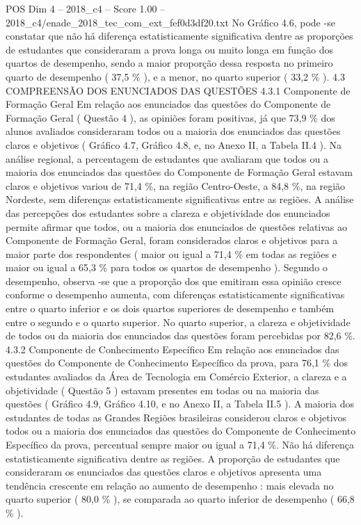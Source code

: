 \begin{textsample}{POS Dim 4 – 2018\_c4 – Score 1.00 – 2018\_c4/enade\_2018\_tec\_com\_ext\_fef0d3df20.txt}
No Gráfico 4.6, pode -se constatar que não há diferença estatisticamente significativa dentre as proporções de estudantes que consideraram a prova longa ou muito longa em função dos quartos de desempenho, sendo a maior proporção dessa resposta no primeiro quarto de desempenho ( 37,5 \% ), e a menor, no quarto superior ( 33,2 \% ). 4.3 COMPREENSÃO DOS ENUNCIADOS DAS QUESTÕES 4.3.1 Componente de Formação Geral Em relação aos enunciados das questões do Componente de Formação Geral ( Questão 4 ), as opiniões foram positivas, já que 73,9 \% dos alunos avaliados consideraram todos ou a maioria dos enunciados das questões claros e objetivos ( Gráfico 4.7, Gráfico 4.8, e, no Anexo II, a Tabela II.4 ).
Na análise regional, a percentagem de estudantes que avaliaram que todos ou a maioria dos enunciados das questões do Componente de Formação Geral estavam claros e objetivos variou de 71,4 \%, na região Centro-Oeste, a 84,8 \%, na região Nordeste, sem diferenças estatisticamente significativas entre as regiões.
A análise das percepções dos estudantes sobre a clareza e objetividade dos enunciados permite afirmar que todos, ou a maioria dos enunciados de questões relativas ao Componente de Formação Geral, foram considerados claros e objetivos para a maior parte dos respondentes ( maior ou igual a 71,4 \% em todas as regiões e maior ou igual a 65,3 \% para todos os quartos de desempenho ).
Segundo o desempenho, observa -se que a proporção dos que emitiram essa opinião cresce conforme o desempenho aumenta, com diferenças estatisticamente significativas entre o quarto inferior e os dois quartos superiores de desempenho e também entre o segundo e o quarto superior.
No quarto superior, a clareza e objetividade de todos ou da maioria dos enunciados das questões foram percebidas por 82,6 \%. 4.3.2 Componente de Conhecimento Específico Em relação aos enunciados das questões do Componente de Conhecimento Específico da prova, para 76,1 \% dos estudantes avaliados da Área de Tecnologia em Comércio Exterior, a clareza e a objetividade ( Questão 5 ) estavam presentes em todas ou na maioria das questões ( Gráfico 4.9, Gráfico 4.10, e no Anexo II, a Tabela II.5 ).
A maioria dos estudantes de todas as Grandes Regiões brasileiras considerou claros e objetivos todos ou a maioria dos enunciados das questões do Componente de Conhecimento Específico da prova, percentual sempre maior ou igual a 71,4 \%.
Não há diferença estatisticamente significativa dentre as regiões.
A proporção de estudantes que consideraram os enunciados das questões claros e objetivos apresenta uma tendência crescente em relação ao aumento de desempenho : mais elevada no quarto superior ( 80,0 \% ), se comparada ao quarto inferior de desempenho ( 66,8 \% ).

\end{textsample}
